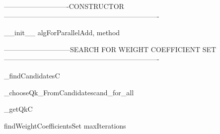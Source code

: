----------------------------CONSTRUCTOR-------------------------------------------------------------------

\begin{method}{\_\_init\_\_}{ algForParallelAdd, method}

\end{method}

-----------------------------SEARCH FOR WEIGHT COEFFICIENT SET-------------------------------------------------------------------

\begin{method}{\_findCandidates}{C}

\end{method}


\begin{method}{\_chooseQk\_FromCandidates}{cand\_for\_all}

\end{method}


\begin{method}{\_getQk}{C}

\end{method}


\begin{method}{findWeightCoefficientsSet}{ maxIterations}

\end{method}

